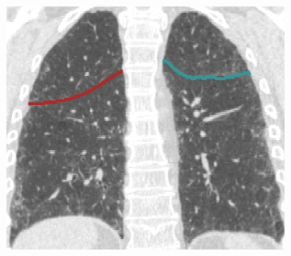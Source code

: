 {\begin{figure}[htbp]
\begin{subfigure}{.32\linewidth}
  \caption{}
  \label{fig:IPFSegmentationResults-h} 
\end{subfigure}
\begin{subfigure}{.32\linewidth}%
  \includegraphics[width=\linewidth,trim={{.0\wd0} {.0\wd0} {.0\wd0} {.0\wd0}},clip]{Segmentation/Image/IPF203_FinalResult_Coronal364.png}

\end{subfigure}
\end{figure}}
